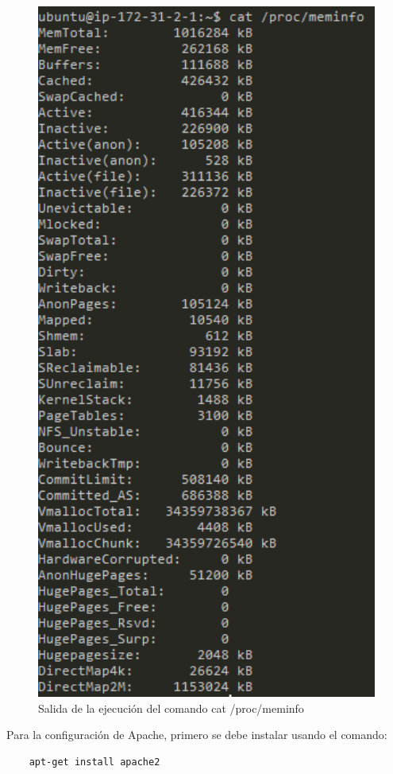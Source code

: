 \begin{figure}[H]
   \centering
   \includegraphics[width=12cm]{img/meminfo}
   \caption{Salida de la ejecución del comando cat /proc/meminfo}
   \label{figura:meminfo}
\end{figure}


Para la configuración de Apache, primero se debe instalar usando el comando: 

\begin{verbatim}
	apt-get install apache2
\end{verbatim}

